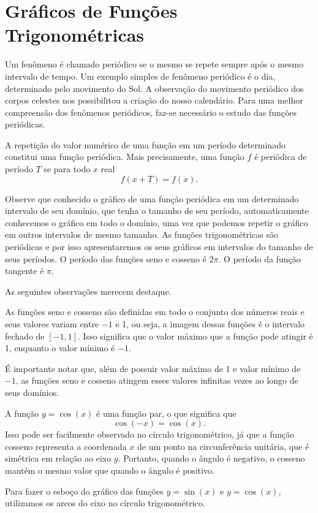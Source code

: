 \section{Gráficos de Funções Trigonométricas}

Um fenômeno é chamado periódico se o mesmo se repete sempre após o mesmo
intervalo de tempo. Um exemplo simples de fenômeno periódico é o dia,
determinado pelo movimento do Sol. A observação do movimento periódico dos
corpos celestes nos possibilitou a criação do nosso calendário. Para uma melhor
compreensão dos fenômenos periódicos, faz-se necessário o estudo das funções
periódicas.

A repetição do valor numérico de uma função em um período determinado constitui
uma função periódica. Mais precisamente, uma função $f$ é periódica de período
$T$ se para todo $x$ real
\[
  f(x+T)=f(x).
\]

Observe que conhecido o gráfico de uma função periódica em um determinado
intervalo de seu domínio, que tenha o tamanho de seu período, automaticamente
conhecemos  o gráfico em todo o domínio, uma vez que podemos repetir o gráfico
em outros intervalos de mesmo tamanho. As funções trigonométricas são
periódicas e por isso apresentaremos os seus gráficos em intervalos do tamanho
de seus períodos. O período das funções seno e cosseno é $2\pi$. O período
da função tangente é $\pi$.

As seguintes observações merecem destaque.

As funções seno e cosseno são definidas em todo o conjunto dos
números reais e seus valores variam entre $-1$ e 1, ou seja, a imagem
dessas funções é o intervalo fechado de $[-1, 1]$. Isso significa que o
valor máximo que a função pode atingir é 1, enquanto o valor mínimo é
$-1$.

É importante notar que, além de possuir valor máximo de 1 e valor
mínimo de $-1$, as funções seno e cosseno atingem esses valores
infinitas vezes ao longo de seus domínios.

A função $y = \cos(x)$ é uma função par, o que significa que
\[
  \cos(-x) = \cos(x).
\]
Isso pode ser facilmente observado no círculo
trigonométrico, já que a função cosseno representa a coordenada $x$ de um
ponto na circunferência unitária, que é simétrica em relação ao eixo $y$.
Portanto, quando o ângulo é negativo, o cosseno mantém o mesmo valor
que quando o ângulo é positivo.

Para fazer o esboço do gráfico das funções $y=\sin(x)$ e
$y=\cos(x)$, utilizamos os arcos do eixo no círculo trigonométrico.

